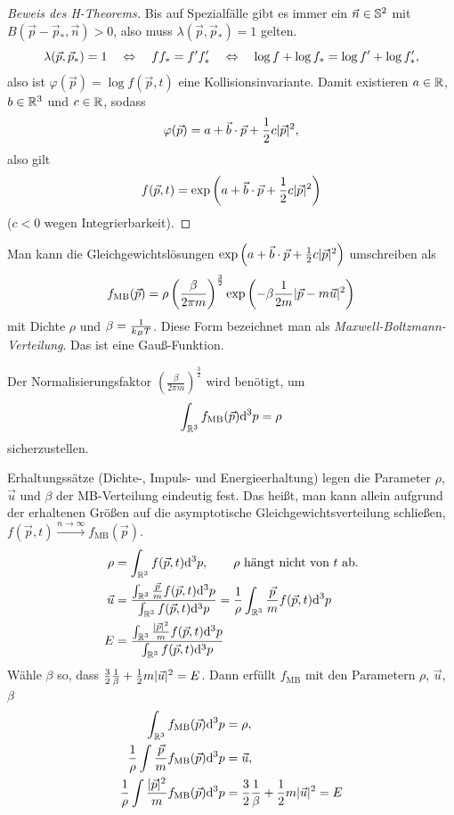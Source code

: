 \begin{proof}[Beweis des H-Theorems]
Bis auf Spezialfälle gibt es immer ein $\vec{n} \in \mathbb{S}^2$ mit $B(
\vec{p} -  \vec{p}_*, \vec{n} ) > 0$, also muss $\lambda( \vec{p}, \vec{p}_*) =
1$ gelten.
\[ \lambda( \vec{p}, \vec{p}_* ) = 1 \quad \Leftrightarrow \quad f f_* = f' f_*' \quad \Leftrightarrow \quad \log f + \log
  f_* = \log f' + \log f_*', \]
also ist $\varphi(\vec{p}) = \log f(\vec{p}, t)$ eine Kollisionsinvariante.
Damit existieren $a \in \mathbb{R}$, $b \in \mathbb{R}^3$ und $c \in \mathbb{R}$, sodass
\[ \varphi( \vec{p} ) = a + \vec{b} \cdot \vec{p} + \frac{1}{2} c |\vec{p}|^2, \]
also gilt
\[ f( \vec{p}, t ) = \exp \left( a + \vec{b} \cdot \vec{p} + \frac{1}{2} c
    |\vec{p}|^2 \right) \]
($c < 0$ wegen Integrierbarkeit).
\end{proof}

\begin{rmrk*}
  Man kann die Gleichgewichtslösungen $\exp \left( a + \vec{b} \cdot \vec{p} +
    \frac{1}{2} c |\vec{p}|^2 \right)$ umschreiben als
  \[ f_{\mathrm{MB}}(\vec{p}) = \rho \left( \frac{\beta}{2 \pi m}
    \right)^{\frac{3}{2}} \exp \left( - \beta \frac{1}{2m} |\vec{p}- m\vec{u}|^2
    \right) \]
  mit Dichte $\rho$ und $\beta = \frac{1}{k_B T}$. Diese Form bezeichnet man als
  \emph{Maxwell-Boltzmann-Verteilung}. Das ist eine Gauß-Funktion.

  Der Normalisierungsfaktor $\left( \frac{\beta}{2 \pi m} \right)^{\frac{3}{2}}$
  wird benötigt, um
  \[ \int_{\mathbb{R}^3} f_{\mathrm{MB}}(\vec{p}) \mathrm{d}^3 p = \rho \]
  sicherzustellen.

  Erhaltungssätze (Dichte-, Impuls- und Energieerhaltung) legen die Parameter
  $\rho$, $\vec{u}$ und $\beta$ der MB-Verteilung eindeutig fest. Das heißt, man
  kann allein aufgrund der erhaltenen Größen auf die asymptotische
  Gleichgewichtsverteilung schließen, $f(\vec{p}, t) \xrightarrow{n \to \infty}
  f_{\mathrm{MB}}(\vec{p})$.
  \[ \begin{aligned}
      \rho &= \int_{\mathbb{R}^3} f( \vec{p}, t ) \mathrm{d}^3 p, 
      \qquad \text{$\rho$ hängt nicht von $t$ ab.} \\
      \vec{u} &= \frac{\int_{\mathbb{R}^3} \frac{\vec{p}}{m} f(\vec{p}, t) \mathrm{d}^3
        p}{\int_{\mathbb{R}^3} f( \vec{p}, t ) \mathrm{d}^3 p}
      = \frac{1}{\rho} \int_{\mathbb{R}^3} \frac{\vec{p}}{m} f(\vec{p}, t) \mathrm{d}^3 p \\
      E &= \frac{ \int_{\mathbb{R}^3} \frac{|\vec{p}|^2}{m}  f(\vec{p}, t) \mathrm{d}^3
        p}{\int_{\mathbb{R}^3} f(\vec{p}, t) \mathrm{d}^3 p}
    \end{aligned} \]
  Wähle $\beta$ so, dass $\frac{3}{2} \frac{1}{\beta} + \frac{1}{2} m |\vec{u}|^2 = E$.
  Dann erfüllt $f_{\mathrm{MB}}$ mit den Parametern $\rho$, $\vec{u}$, $\beta$
  \[ \begin{aligned}
      \int_{\mathbb{R}^3} f_{\mathrm{MB}}( \vec{p} ) \mathrm{d}^3 p &= \rho, \\
      \frac{1}{\rho} \int \frac{\vec{p}}{m} f_{\mathrm{MB}}(\vec{p}) \mathrm{d}^3 p &=
      \vec{u}, \\
      \frac{1}{\rho} \int \frac{|\vec{p}|^2}{m} f_{\mathrm{MB}}(\vec{p}) \mathrm{d}^3 p
      &= \frac{3}{2} \frac{1}{\beta} + \frac{1}{2} m |\vec{u}|^2 = E
    \end{aligned}
  \]
\end{rmrk*}

